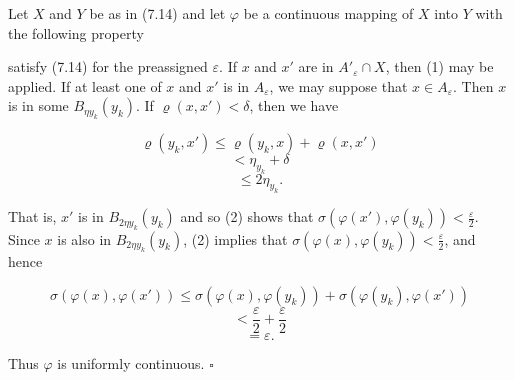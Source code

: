 Let $X$ and $Y$ be as in (7.14) and let $\varphi$ be a continuous mapping of $X$ into $Y$ with the following property

satisfy (7.14) for the preassigned $\varepsilon$. If $x$ and $x'$ are in $A'_{\varepsilon} \cap X$, then (1) may be applied. If at least one of $x$ and $x'$ is in $A_{\varepsilon}$, we may suppose that $x \in A_{\varepsilon}$. Then $x$ is in some $B_{\eta y_k}(y_k)$. If $\varrho(x, x') < \delta$, then we have

$$\varrho(y_k, x') \leq \varrho(y_k, x) + \varrho(x, x')$$
$$< \eta_{y_k} + \delta$$
$$\leq 2 \eta_{y_k}.$$

That is, $x'$ is in $B_{2\eta y_k}(y_k)$ and so (2) shows that $\sigma(\varphi(x'), \varphi(y_k)) < \frac{\varepsilon}{2}$. Since $x$ is also in $B_{2\eta y_k}(y_k)$, (2) implies that $\sigma(\varphi(x), \varphi(y_k)) < \frac{\varepsilon}{2}$, and hence

$$\sigma(\varphi(x), \varphi(x')) \leq \sigma(\varphi(x), \varphi(y_k)) + \sigma(\varphi(y_k), \varphi(x'))$$
$$< \frac{\varepsilon}{2} + \frac{\varepsilon}{2}$$
$$= \varepsilon.$$

Thus $\varphi$ is uniformly continuous. $\square$